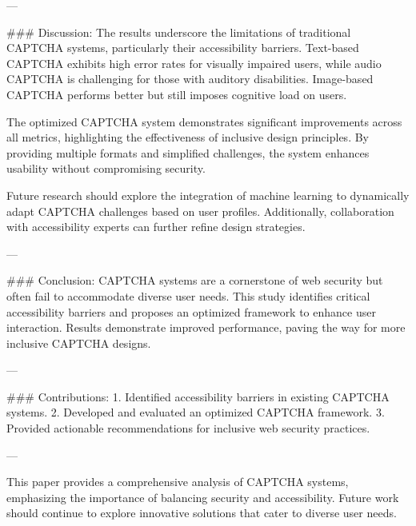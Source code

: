 ---

### Discussion:
The results underscore the limitations of traditional CAPTCHA systems, particularly their accessibility barriers. Text-based CAPTCHA exhibits high error rates for visually impaired users, while audio CAPTCHA is challenging for those with auditory disabilities. Image-based CAPTCHA performs better but still imposes cognitive load on users.

The optimized CAPTCHA system demonstrates significant improvements across all metrics, highlighting the effectiveness of inclusive design principles. By providing multiple formats and simplified challenges, the system enhances usability without compromising security.

Future research should explore the integration of machine learning to dynamically adapt CAPTCHA challenges based on user profiles. Additionally, collaboration with accessibility experts can further refine design strategies.

---

### Conclusion:
CAPTCHA systems are a cornerstone of web security but often fail to accommodate diverse user needs. This study identifies critical accessibility barriers and proposes an optimized framework to enhance user interaction. Results demonstrate improved performance, paving the way for more inclusive CAPTCHA designs.

---

### Contributions:
1. Identified accessibility barriers in existing CAPTCHA systems.
2. Developed and evaluated an optimized CAPTCHA framework.
3. Provided actionable recommendations for inclusive web security practices.

---

This paper provides a comprehensive analysis of CAPTCHA systems, emphasizing the importance of balancing security and accessibility. Future work should continue to explore innovative solutions that cater to diverse user needs.